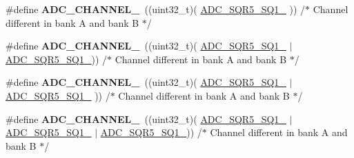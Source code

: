 \begin{DoxyCompactItemize}
\item 
\hypertarget{group___a_d_c__channels_gab0917f6b66213f33f2e2ea8781df5aa9}{\#define {\bfseries A\-D\-C\-\_\-\-C\-H\-A\-N\-N\-E\-L\-\_}~((uint32\-\_\-t)(                 \hyperlink{group___peripheral___registers___bits___definition_ga7aeddef7b3153a014f66e11e72dd0bba}{A\-D\-C\-\_\-\-S\-Q\-R5\-\_\-\-S\-Q1\-\_}                                                   ))  /$\ast$ Channel different in bank A and bank B $\ast$/}\label{group___a_d_c__channels_gab0917f6b66213f33f2e2ea8781df5aa9}

\item 
\hypertarget{group___a_d_c__channels_ga95f485ecc05187c3d475238a88beef1c}{\#define {\bfseries A\-D\-C\-\_\-\-C\-H\-A\-N\-N\-E\-L\-\_}~((uint32\-\_\-t)(                 \hyperlink{group___peripheral___registers___bits___definition_ga7aeddef7b3153a014f66e11e72dd0bba}{A\-D\-C\-\_\-\-S\-Q\-R5\-\_\-\-S\-Q1\-\_}                                   $\vert$ \hyperlink{group___peripheral___registers___bits___definition_ga6d7b92bf8ba789b76256e205988cc8de}{A\-D\-C\-\_\-\-S\-Q\-R5\-\_\-\-S\-Q1\-\_}))  /$\ast$ Channel different in bank A and bank B $\ast$/}\label{group___a_d_c__channels_ga95f485ecc05187c3d475238a88beef1c}

\item 
\hypertarget{group___a_d_c__channels_gaa55df8c97225d32b495959896897567c}{\#define {\bfseries A\-D\-C\-\_\-\-C\-H\-A\-N\-N\-E\-L\-\_}~((uint32\-\_\-t)(                 \hyperlink{group___peripheral___registers___bits___definition_ga7aeddef7b3153a014f66e11e72dd0bba}{A\-D\-C\-\_\-\-S\-Q\-R5\-\_\-\-S\-Q1\-\_}                  $\vert$ \hyperlink{group___peripheral___registers___bits___definition_ga374490cc8d96ed0a40d3f212bc6fd6d1}{A\-D\-C\-\_\-\-S\-Q\-R5\-\_\-\-S\-Q1\-\_}                 ))  /$\ast$ Channel different in bank A and bank B $\ast$/}\label{group___a_d_c__channels_gaa55df8c97225d32b495959896897567c}

\item 
\hypertarget{group___a_d_c__channels_gaf36361a33c07b04f8ab1d58d232bc434}{\#define {\bfseries A\-D\-C\-\_\-\-C\-H\-A\-N\-N\-E\-L\-\_}~((uint32\-\_\-t)(                 \hyperlink{group___peripheral___registers___bits___definition_ga7aeddef7b3153a014f66e11e72dd0bba}{A\-D\-C\-\_\-\-S\-Q\-R5\-\_\-\-S\-Q1\-\_}                  $\vert$ \hyperlink{group___peripheral___registers___bits___definition_ga374490cc8d96ed0a40d3f212bc6fd6d1}{A\-D\-C\-\_\-\-S\-Q\-R5\-\_\-\-S\-Q1\-\_} $\vert$ \hyperlink{group___peripheral___registers___bits___definition_ga6d7b92bf8ba789b76256e205988cc8de}{A\-D\-C\-\_\-\-S\-Q\-R5\-\_\-\-S\-Q1\-\_}))  /$\ast$ Channel different in bank A and bank B $\ast$/}\label{group___a_d_c__channels_gaf36361a33c07b04f8ab1d58d232bc434}


\end{DoxyCompactItemize}
